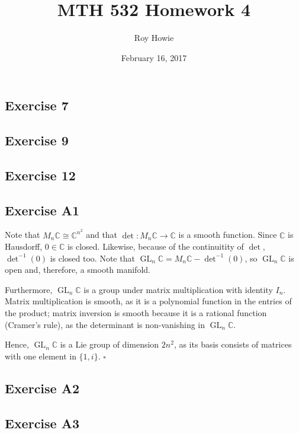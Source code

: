 \documentclass{article}
\newcommand{\C}{\mathbb{C}}
\DeclareMathOperator{\GL}{GL}
\begin{document}
\title{MTH 532 Homework 4}
\author{Roy Howie}
\date{February 16, 2017}
\maketitle

\subsection*{Exercise 7}
\subsection*{Exercise 9}
\subsection*{Exercise 12}
\subsection*{Exercise A1}
Note that $M_n\C\cong\C^{n^2}$ and that $\det\colon M_n\C\to\C$ is a smooth
function. Since $\C$ is Hausdorff, $0\in\C$ is closed. Likewise, because of the
continuitity of $\det$, $\det^{-1}(0)$ is closed too. Note that $\GL_n\C=
M_n\C-\det^{-1}(0)$, so $\GL_n\C$ is open and, therefore, a smooth manifold.

Furthermore, $\GL_n\C$ is a group under matrix multiplication with identity
$I_n$. Matrix multiplication is smooth, as it is a polynomial function in the
entries of the product; matrix inversion is smooth because it is a rational
function (Cramer's rule), as the determinant is non-vanishing in $\GL_n\C$.

%

Hence, $\GL_n\C$ is a Lie group of dimension $2n^2$, as its basis consists of
matrices with one element in $\{1,i\}$.
\hfill $\square$

\subsection*{Exercise A2}
\subsection*{Exercise A3}
\end{document}
